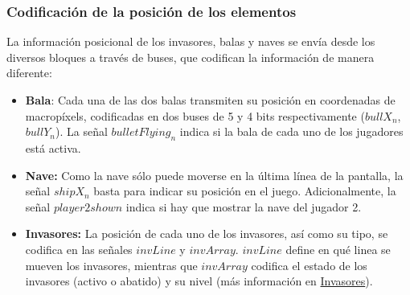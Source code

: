 \subsubsection*{Codificación de la posición de los elementos}

La información posicional de los invasores, balas y naves se envía desde los diversos bloques a través de buses, que codifican la información de manera diferente:

\begin{itemize}
\item \textbf{Bala}: Cada una de las dos balas transmiten su posición en coordenadas de macropíxels, codificadas en dos buses de 5 y 4 bits respectivamente ($bullX_n$, $bullY_n$). La señal $bulletFlying_n$ indica si la bala de cada uno de los jugadores está activa.

\item \textbf{Nave:} Como la nave sólo puede moverse en la última línea de la pantalla, la señal $shipX_n$ basta para indicar su posición en el juego. Adicionalmente, la señal $player2shown$ indica si hay que mostrar la nave del jugador 2.

\item \textbf{Invasores:} La posición de cada uno de los invasores, así como su tipo, se codifica en las señales $invLine$ y $invArray$. $invLine$ define en qué linea se mueven los invasores, mientras que $invArray$ codifica el estado de los invasores (activo o abatido) y su nivel (más información en \hyperref[invaders]{Invasores}).

\end{itemize}